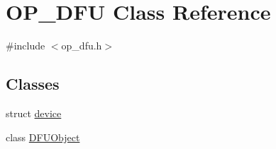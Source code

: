 \hypertarget{class_o_p___d_f_u}{\section{O\-P\-\_\-\-D\-F\-U Class Reference}
\label{class_o_p___d_f_u}
}


{\ttfamily \#include $<$op\-\_\-dfu.\-h$>$}

\subsection*{Classes}
\begin{DoxyCompactItemize}
\item 
struct \hyperlink{struct_o_p___d_f_u_1_1device}{device}
\item 
class \hyperlink{class_o_p___d_f_u_1_1_d_f_u_object}{D\-F\-U\-Object}
\end{DoxyCompactItemize}
